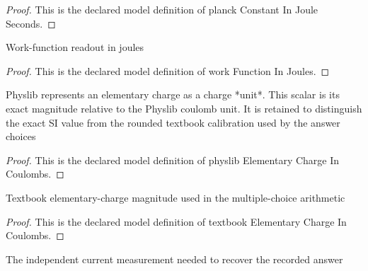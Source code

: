 \begin{proof}
  This is the declared model definition of planck Constant In Joule Seconds.
\end{proof}
\begin{definition}
  \label{def:physics:phyx-mini-0498:phyxminiproblems-problemphyxmini0498-workfunctioninjoules}
  Work-function readout in joules
\end{definition}
\begin{proof}
  This is the declared model definition of work Function In Joules.
\end{proof}
\begin{definition}
  \label{def:physics:phyx-mini-0498:phyxminiproblems-problemphyxmini0498-physlibelementarychargeincoulombs}
  Physlib represents an elementary charge as a charge *unit*. This scalar is its exact magnitude relative to the Physlib coulomb unit. It is retained to distinguish the exact SI value from the rounded textbook calibration used by the answer choices
\end{definition}
\begin{proof}
  This is the declared model definition of physlib Elementary Charge In Coulombs.
\end{proof}
\begin{definition}
  \label{def:physics:phyx-mini-0498:phyxminiproblems-problemphyxmini0498-textbookelementarychargeincoulombs}
  Textbook elementary-charge magnitude used in the multiple-choice arithmetic
\end{definition}
\begin{proof}
  This is the declared model definition of textbook Elementary Charge In Coulombs.
\end{proof}
\begin{definition}
  \label{def:physics:phyx-mini-0498:phyxminiproblems-problemphyxmini0498-tenmicroamperesinamperes}
  The independent current measurement needed to recover the recorded answer
\end{definition}
